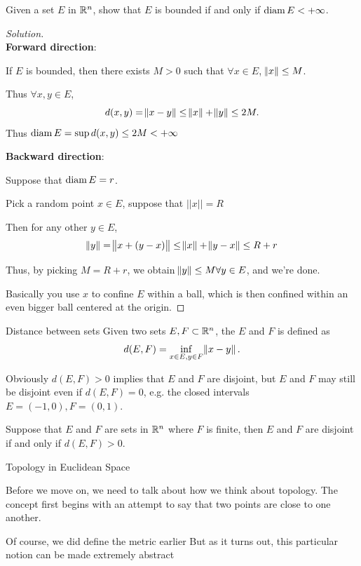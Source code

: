 \begin{prbm}
Given a set $E$ in $\mathbb R^n$, show that $E$ is bounded if and only if $\operatorname{diam} E < +\infty$.
\end{prbm}

\begin{proof}[Solution] \ {\\}
\textbf{Forward direction}:

If $E$ is bounded, then there exists $M>0$ such that $\forall x \in E$, $\norm{x} \le M$.

Thus $\forall x,y \in E$,
\[ d(x,y) = \norm{x-y} \le \norm{x} + \norm{y} \le 2M. \]
Thus $\operatorname{diam} E = \sup d(x,y) \le 2M < +\infty$

\textbf{Backward direction}:

Suppose that $\operatorname{diam} E = r$.

Pick a random point $x \in E$, suppose that $||x||=R$

Then for any other $y \in E$,
\[ \norm{y} = \norm{x+(y-x)} \le \norm{x} + \norm{y-x} \le R+r \]

Thus, by picking $M=R+r$, we obtain $\norm{y} \le M \forall y \in E$, and we're done.

Basically you use $x$ to confine $E$ within a ball, which is then confined within an even bigger ball centered at the origin.
\end{proof}

\begin{defn}{Distance between sets}{}
Given two sets $E,F \subset \mathbb R^n$, the  $E$ and $F$ is defined as 
\[ d(E,F) = \inf_{x\in E, y\in F}\norm{x-y}. \]
\end{defn}

Obviously $d(E,F)>0$ implies that $E$ and $F$ are disjoint, but $E$ and $F$ may still be disjoint even if $d(E,F)=0$, e.g. the closed intervals $E=(-1,0), F=(0,1)$.

\begin{prbm}
Suppose that $E$ and $F$ are sets in $\mathbb R^n$ where $F$ is finite, then $E$ and $F$ are disjoint if and only if $d(E,F)>0$.
\end{prbm}

Topology in Euclidean Space

Before we move on, we need to talk about how we think about topology. The concept first begins with an attempt to say that two points are close to one another. 

Of course, we did define the metric earlier
But as it turns out, this particular notion can be made extremely abstract

